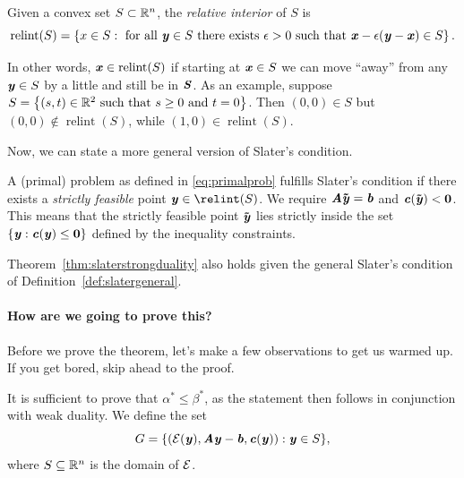 
\begin{definition} \label{def:relint}
  Given a convex set $S \subset \mathbb{R}^n$, the \emph{relative interior} of $S$ is
  \[
    \operatorname{relint}(S) = \left\{x \in S : \text{ for all } \boldsymbol{\mathit{y}}
      \in S \text{ there exists } \epsilon > 0 \text{ such that }
      \boldsymbol{\mathit{x}} - \epsilon(\boldsymbol{\mathit{y}} - \boldsymbol{\mathit{x}}) \in S \right\}
    .
  \]
\end{definition}
In other words, $\boldsymbol{\mathit{x}} \in \operatorname{relint}(S)$ if starting at $\boldsymbol{\mathit{x}}
\in S$ we can move
``away'' from any $\boldsymbol{\mathit{y}} \in S$ by a little and still be in $\boldsymbol{\mathit{S}}$.
As an example, suppose $S = \left\{(s,t) \in \mathbb{R}^2 \text{ such that } s
  \geq 0 \text{ and } t = 0 \right\}$.
Then $(0,0) \in S$ but $(0,0) \not\in \operatorname{relint}(S)$, while
$(1,0) \in \operatorname{relint}(S)$.

Now, we can state a more general version of Slater's condition.

\begin{definition} \label{def:slatergeneral}
A (primal) problem as defined in \eqref{eq:primalprob} fulfills
Slater's condition if there exists a \emph{strictly feasible} point
$\yy \in \relint(S)$.
We require $\boldsymbol{\mathit{A}}\boldsymbol{\tilde{\mathit{y}}} = \boldsymbol{\mathit{b}}$ and $\boldsymbol{\mathit{c}}(\boldsymbol{\tilde{\mathit{y}}}) <
\boldsymbol{0}$.
This means that the strictly feasible point $\boldsymbol{\tilde{\mathit{y}}}$ lies strictly inside the set $\{\boldsymbol{\mathit{y}} : \boldsymbol{\mathit{c}}(\boldsymbol{\mathit{y}}) \leq \boldsymbol{0}\}$ defined by the inequality constraints.
\end{definition}

Theorem~\ref{thm:slaterstrongduality} also holds given the general
Slater's condition of Definition~\ref{def:slatergeneral}.

\paragraph{How are we going to prove this?} Before we prove the theorem, let's make a few observations to get us
warmed up. If you get bored, skip ahead to the proof.

It is sufficient to prove that $\alpha^* \leq \beta^*$, as the statement then follows in conjunction with weak duality.
We define the set
\begin{equation*} G = \{(\mathcal{E}(\boldsymbol{\mathit{y}}), \boldsymbol{\mathit{A}}\boldsymbol{\mathit{y}} - \boldsymbol{\mathit{b}}, \boldsymbol{\mathit{c}}(\boldsymbol{\mathit{y}})) : \boldsymbol{\mathit{y}} \in S \}, \end{equation*}
where $S \subseteq \mathbb{R}^n$ is the domain of $\mathcal{E}$.

